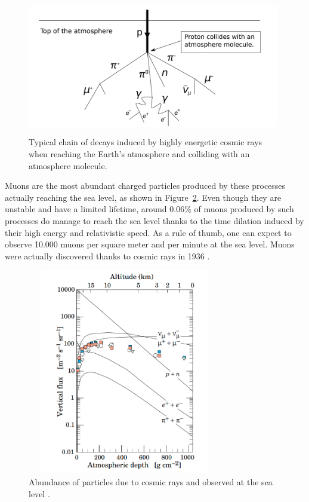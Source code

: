 \documentclass[a4paper, 11pt, twoside, openright]{report}
\begin{document}
\begin{figure}[htbp]
\begin{center}
\includegraphics[width=11cm, height=6cm]{figs/cosmic.png}
\caption{Typical chain of decays induced by highly energetic cosmic rays when reaching the Earth's atmosphere and colliding with an atmosphere molecule.}
\label{figure:cosmic}
\end{center}
\end{figure}

\newpage
Muons are the most abundant charged particles produced by these processes actually reaching the sea level, as shown in Figure~\ref{figure:cosmicAbundance}. Even though they are unstable and have a limited lifetime, around 0.06\% of muons produced by such processes do manage to reach the sea level thanks to the time dilation induced by their high energy and relativistic speed. As a rule of thumb, one can expect to observe 10.000 muons per square meter and per minute at the sea level. Muons were actually discovered thanks to cosmic rays in 1936 \cite{muonDiscovery}.

\begin{figure}[htbp]
\begin{center}
\includegraphics[width=8.5cm, height=9cm]{figs/cosmicMuons.png}
\caption{Abundance of particles due to cosmic rays and observed at the sea level \cite{cosmicPDG}.}
\label{figure:cosmicAbundance}
\end{center}
\end{figure}
\end{document}
